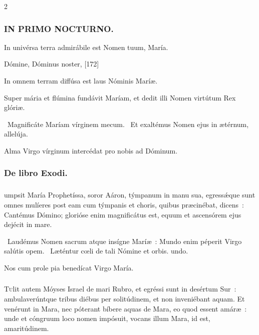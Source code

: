 \documentclass[9pt,twoside]{extarticle}
\begin{document}
\begin{multicols}{2}
{{\subsubsection*{\center \textsc{IN PRIMO NOCTURNO.}}
\begin{tightlist}{}
\item {} In univérsa terra admirábile est Nomen tuum, María.
\item {} Dómine, Dóminus noster,  [172]
\item {} In omnem terram diffúsa est laus Nóminis Maríæ.
\item {} Super mária et flúmina fundávit Maríam, et dedit illi Nomen virtútum Rex glóriæ.
\item {}~Magnificáte Maríam vírginem mecum. ~Et exaltémus Nomen ejus in ætérnum, allelúja.
\item {\small {} Alma Virgo vírginum intercédat pro nobis ad Dóminum.}
\end{tightlist}

\subsubsection*{\center De libro Exodi.}
\subsubsection*{\center {}}
umpsit María Prophetíssa, soror Aáron, týmpanum in manu sua, egressǽque sunt omnes mulíeres post eam cum týmpanis et choris, quibus præcinébat, dicens~: Cantémus Dómino; glorióse enim magnificátus est, equum et ascensórem ejus dejécit in mare.

\begin{tightlist}{}
\item {}~Laudémus Nomen sacrum atque insígne Maríæ~: \textred{*} Mundo enim péperit Virgo salútis opem. ~Læténtur cœli de tali Nómine et orbis. undo.
\item {\small {} Nos cum prole pia benedícat Virgo María.}
\end{tightlist}

\subsubsection*{\center {}}
\lettrine{T}ulit autem Móyses Israel de mari Rubro, et egréssi sunt in desértum Sur~: ambulaverúntque tribus diébus per solitúdinem, et non inveniébant aquam. Et venérunt in Mara, nec póterant bíbere aquas de Mara, eo quod essent amáræ~: unde et cóngruum loco nomen impósuit, vocans illum Mara, id est, amaritúdinem.

}}
\end{multicols}
\end{document}
